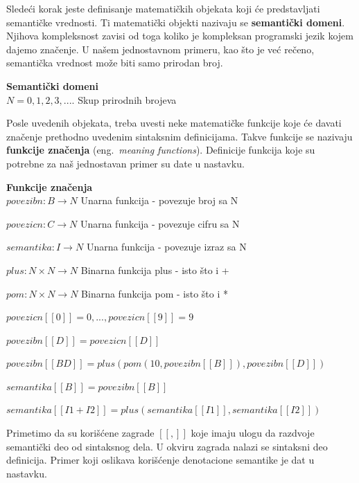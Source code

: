 \documentclass[a4paper]{article}
\begin{document}
Sledeći korak jeste definisanje matematičkih objekata koji će predstavljati semantičke vrednosti.  Ti matematički objekti nazivaju se \textbf{semantički domeni}. Njihova kompleksnost zavisi od toga koliko je kompleksan programski jezik kojem dajemo značenje. U našem jednostavnom primeru, kao što je već rečeno, semantička vrednost može biti samo prirodan broj.
\begin{tcolorbox}
\textbf{Semantički domeni}
\\

$N={0,1,2,3,....} $  \qquad\qquad Skup prirodnih brojeva

\end{tcolorbox}
Posle uvedenih objekata, treba uvesti neke matematičke funkcije koje će davati značenje prethodno uvedenim sintaksnim definicijama. Takve funkcije se nazivaju \textbf{funkcije značenja }(eng.~{\em meaning functions}). Definicije funkcija koje su potrebne za naš jednostavan primer su date u nastavku.
\begin{tcolorbox}
\textbf{Funkcije značenja}
\\

$povezibn: B \rightarrow N $  \qquad Unarna funkcija - povezuje broj sa N

$povezicn: C \rightarrow N $  \qquad Unarna funkcija - povezuje cifru sa N

$semantika: I \rightarrow N $   \qquad Unarna funkcija - povezuje izraz sa N

$plus: N \times N \rightarrow N $  \qquad Binarna funkcija plus - isto što i +

$pom: N \times N \rightarrow N $ \qquad Binarna funkcija pom - isto što i *

$ povezicn[[0]] = 0,... ,povezicn[[9]] = 9 $

$ povezibn[[D]] = povezicn[[D]] $

$ povezibn[[B D]] = plus(pom(10, povezibn[[B]]),povezibn[[D]]) $

$ semantika[[B]] = povezibn[[B]] $

$ semantika[[I1 + I2]] = plus(semantika[[I1]],semantika[[I2]]) $

\end{tcolorbox}
Primetimo da su korišćene zagrade $ [[,]]$ koje imaju ulogu da razdvoje semantički deo od sintaksnog dela. U okviru zagrada nalazi se sintaksni deo definicija. Primer koji oslikava korišćenje denotacione semantike je dat u nastavku.
\end{document}
